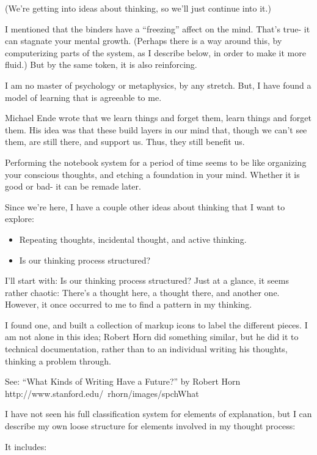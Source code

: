 \documentclass[oneside]{book}
\begin{document}
(We're getting into ideas about thinking, so we'll just continue into
it.)

I mentioned that the binders have a ``freezing'' affect on the
mind. That's true- it can stagnate your mental growth. (Perhaps there
is a way around this, by computerizing parts of the system, as I
describe below, in order to make it more fluid.) But by the same
token, it is also reinforcing.

I am no master of psychology or metaphysics, by any stretch. But, I
have found a model of learning that is agreeable to me.

Michael Ende wrote that we learn things and forget them, learn things
and forget them. His idea was that these build layers in our mind
that, though we can't see them, are still there, and support us. Thus,
they still benefit us.

Performing the notebook system for a period of time seems to be like
organizing your conscious thoughts, and etching a foundation in your
mind. Whether it is good or bad- it can be remade later.

Since we're here, I have a couple other ideas about thinking that I
want to explore:

\begin{itemize}
\item Repeating thoughts, incidental thought, and active thinking.
\item Is our thinking process structured?
\end{itemize}

I'll start with:
Is our thinking process structured? Just at a glance, it seems rather
chaotic: There's a thought here, a thought there, and another
one. However, it once occurred to me to find a pattern in my thinking.

I found one, and built a collection of markup icons to label the
different pieces. I am not alone in this idea; Robert Horn did
something similar, but he did it to technical documentation, rather
than to an individual writing his thoughts, thinking a problem
through.

  See: ``What Kinds of Writing Have a Future?''
  by Robert Horn
  http://www.stanford.edu/~rhorn/images/spchWhat%

I have not seen his full classification system for elements of
explanation, but I can describe my own loose structure for elements
involved in my thought process:

It includes:
\end{document}
